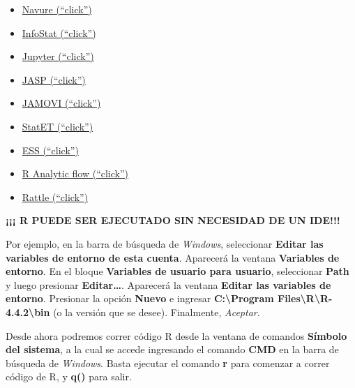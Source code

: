 \documentclass[
  spanish,
  letterpaper,
  DIV=11,
  numbers=noendperiod]{scrreprt}
\begin{document}
\begin{itemize}
\item
  \href{https://www.navure.com/inicio/}{Navure (``click'')}
\item
  \href{https://www.infostat.com.ar/}{InfoStat (``click'')}
\item
  \href{https://jupyter.org/}{Jupyter (``click'')}
\item
  \href{https://jasp-stats.org/download/}{JASP (``click'')}
\item
  \href{https://www.jamovi.org/download.html}{JAMOVI (``click'')}
\item
  \href{https://projects.eclipse.org/projects/science.statet}{StatET
  (``click'')}
\item
  \href{https://ess.r-project.org/}{ESS (``click'')}
\item
  \href{http://r.analyticflow.com/en/}{R Analytic flow (``click'')}
\item
  \href{https://rattle.togaware.com/}{Rattle (``click'')}
\end{itemize}

\begin{tcolorbox}[enhanced jigsaw, arc=.35mm, bottomrule=.15mm, bottomtitle=1mm, breakable, colback=white, colbacktitle=quarto-callout-tip-color!10!white, colframe=quarto-callout-tip-color-frame, coltitle=black, left=2mm, leftrule=.75mm, opacityback=0, opacitybacktitle=0.6, rightrule=.15mm, title=\textcolor{quarto-callout-tip-color}{\faLightbulb}\hspace{0.5em}{Tip}, titlerule=0mm, toprule=.15mm, toptitle=1mm]

\textbf{¡¡¡ R PUEDE SER EJECUTADO SIN NECESIDAD DE UN IDE!!!}

Por ejemplo, en la barra de búsqueda de \emph{Windows}, seleccionar
\textbf{Editar las variables de entorno de esta cuenta}. Aparecerá la
ventana \textbf{Variables de entorno}. En el bloque \textbf{Variables de
usuario para usuario}, seleccionar \textbf{Path} y luego presionar
\textbf{Editar\ldots{}}. Aparecerá la ventana \textbf{Editar las
variables de entorno}. Presionar la opción \textbf{Nuevo} e ingresar
\textbf{C:\textbackslash Program
Files\textbackslash R\textbackslash R-4.4.2\textbackslash bin} (o la
versión que se desee). Finalmente, \emph{Aceptar}.

Desde ahora podremos correr código R desde la ventana de comandos
\textbf{Símbolo del sistema}, a la cual se accede ingresando el comando
\textbf{CMD} en la barra de búsqueda de \emph{Windows}. Basta ejecutar
el comando \textbf{r} para comenzar a correr código de R, y \textbf{q()}
para salir.

\end{tcolorbox}
\end{document}
